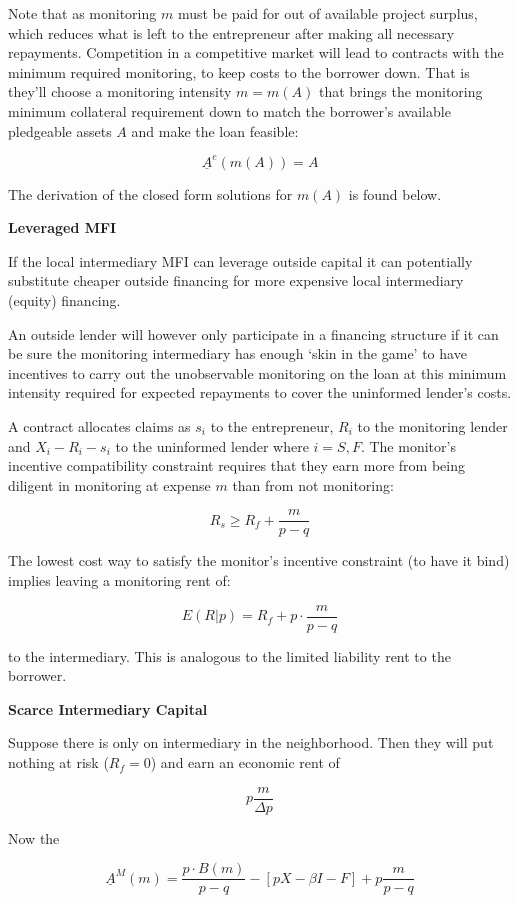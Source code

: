 \documentclass[11pt]{article}
\begin{document}
Note that as monitoring \(m\) must be paid for out of available project
surplus, which reduces what is left to the entrepreneur after making all
necessary repayments. Competition in a competitive market will lead to
contracts with the minimum required monitoring, to keep costs to the
borrower down. That is they'll choose a monitoring intensity \(m=m(A)\)
that brings the monitoring minimum collateral requirement down to match
the borrower's available pledgeable assets \(A\) and make the loan
feasible:

\[\underline A^e(m(A)) = A\]

The derivation of the closed form solutions for \(m(A)\) is found below.

    \textbf{Leveraged MFI}

If the local intermediary MFI can leverage outside capital it can
potentially substitute cheaper outside financing for more expensive
local intermediary (equity) financing.

An outside lender will however only participate in a financing structure
if it can be sure the monitoring intermediary has enough `skin in the
game' to have incentives to carry out the unobservable monitoring on the
loan at this minimum intensity required for expected repayments to cover
the uninformed lender's costs.

A contract allocates claims as \(s_i\) to the entrepreneur, \(R_i\) to
the monitoring lender and \(X_i -R_i - s_i\) to the uninformed lender
where \(i = S, F\). The monitor's incentive compatibility constraint
requires that they earn more from being diligent in monitoring at
expense \(m\) than from not monitoring:

\[R_s \ge R_f + \frac{m}{p-q} \]

    The lowest cost way to satisfy the monitor's incentive constraint (to
have it bind) implies leaving a monitoring rent of:

\[E(R|p) = R_f + p \cdot \frac{m}{p-q}\]

to the intermediary. This is analogous to the limited liability rent to
the borrower.

\textbf{Scarce Intermediary Capital}

Suppose there is only on intermediary in the neighborhood. Then they
will put nothing at risk (\(R_f=0\)) and earn an economic rent of

\[
p \frac{m}{\Delta p}
\]

Now the

\[
\underline A^M(m) = \frac{p \cdot B(m)}{p-q} - \left[ {pX - \beta I - F} \right]  +  p \frac{m}{p-q}
\]
\end{document}
